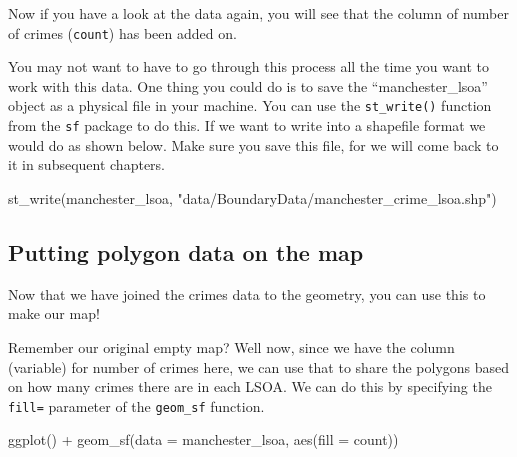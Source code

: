 \documentclass[
  krantz2]{krantz}
\makeatletter
\newenvironment{Shaded}{\begin{snugshade}}{\end{snugshade}}
\newcommand{\AttributeTok}[1]{\textcolor[rgb]{0.61,0.61,0.61}{#1}}
\newcommand{\FunctionTok}[1]{\textcolor[rgb]{0,0,0}{#1}}
\newcommand{\NormalTok}[1]{#1}
\newcommand{\SpecialCharTok}[1]{\textcolor[rgb]{0,0,0}{#1}}
\newcommand{\StringTok}[1]{\textcolor[rgb]{0.5,0.5,0.5}{#1}}
\newenvironment{kframe}{%
\medskip{}
\setlength{\fboxsep}{.8em}
 \def\at@end@of@kframe{}%
 \ifinner\ifhmode%
  \def\at@end@of@kframe{\end{minipage}}%
  \begin{minipage}{\columnwidth}%
 \fi\fi%
 \def\FrameCommand##1{\hskip\@totalleftmargin \hskip-\fboxsep
 \colorbox{shadecolor}{##1}\hskip-\fboxsep
     \hskip-\linewidth \hskip-\@totalleftmargin \hskip\columnwidth}%
 \MakeFramed {\advance\hsize-\width
   \@totalleftmargin\z@ \linewidth\hsize
   \@setminipage}}%
 {\par\unskip\endMakeFramed%
 \at@end@of@kframe}
\renewenvironment{Shaded}{\begin{kframe}}{\end{kframe}}
\makeatother
\begin{document}
Now if you have a look at the data again, you will see that the column of number of crimes (\texttt{count}) has been added on.

You may not want to have to go through this process all the time you want to work with this data. One thing you could do is to save the ``manchester\_lsoa'' object as a physical file in your machine. You can use the \texttt{st\_write()} function from the \texttt{sf} package to do this. If we want to write into a shapefile format we would do as shown below. Make sure you save this file, for we will come back to it in subsequent chapters.

\begin{Shaded}
\begin{Highlighting}[]
\FunctionTok{st\_write}\NormalTok{(manchester\_lsoa, }
         \StringTok{"data/BoundaryData/manchester\_crime\_lsoa.shp"}\NormalTok{)}
\end{Highlighting}
\end{Shaded}

\hypertarget{putting-polygon-data-on-the-map}{%
\subsection{Putting polygon data on the map}\label{putting-polygon-data-on-the-map}}

Now that we have joined the crimes data to the geometry, you can use this to make our map!

Remember our original empty map? Well now, since we have the column (variable) for number of crimes here, we can use that to share the polygons based on how many crimes there are in each LSOA. We can do this by specifying the \texttt{fill=} parameter of the \texttt{geom\_sf} function.

\begin{Shaded}
\begin{Highlighting}[]
\FunctionTok{ggplot}\NormalTok{() }\SpecialCharTok{+} 
\FunctionTok{geom\_sf}\NormalTok{(}\AttributeTok{data =}\NormalTok{ manchester\_lsoa, }\FunctionTok{aes}\NormalTok{(}\AttributeTok{fill =}\NormalTok{ count))}
\end{Highlighting}
\end{Shaded}
\end{document}

